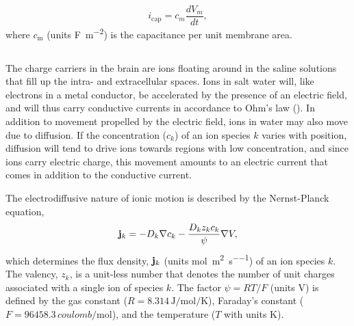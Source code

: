 \begin{equation}
i_\text{cap} = c_m\frac{dV_m}{dt},
\label{eq:Basics:Icap_mem}
\end{equation}
where $c_\text{m}$ (units \si{\farad\per\square\metre}) is the capacitance per unit membrane area. 



\subsection{}
\label{sec:Basics:DiffusiveCurrent}
 
The charge carriers in the brain are ions floating around in the saline solutions that fill up the intra- and extracellular spaces. Ions in salt water will, like electrons in a metal conductor, be accelerated by the presence of an electric field, and will thus carry conductive currents in accordance to Ohm's law (). In addition to movement propelled by the electric field, ions in water may also move due to diffusion. If the concentration ($c_k$) of an ion species $k$ varies with position, diffusion will tend to drive ions towards regions with low concentration, and since ions carry electric charge, this movement amounts to an electric current that comes in addition to the conductive current. 

The electrodiffusive  nature of ionic motion is described by the Nernst-Planck equation,
\begin{equation}
{\bf j}_k = - D_k {\bf \nabla} c_{k} - \frac{D_k z_k c_k}{\psi} {\bf \nabla} V,
\label{eq:Basics:JNP}
\end{equation}
which determines the flux density, ${\bf j}_k$ (units \si{\mole\per\square\metre\per\second}) of an ion species $k$. The valency, $z_{k}$, is a unit-less number that denotes the number of unit charges associated with a single ion of species $k$. The factor $\psi=RT/F$ (units \si{\volt}) is defined by the gas constant ($R = 8.314 \, \si{\joule\per\mole\per\kelvin}$), Faraday's constant ($F = 96458.3\, \si{coulomb\per\mole}$), and the temperature ($T$ with units \si{\kelvin}).

